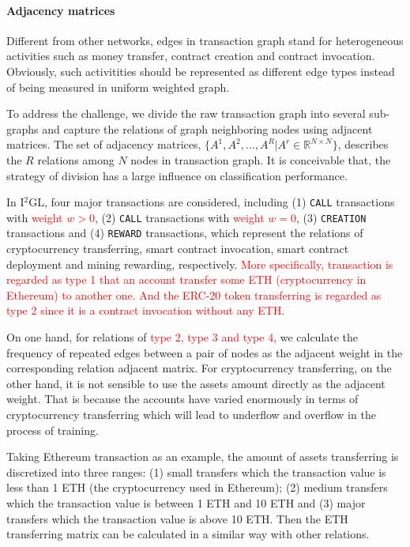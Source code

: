 \paragraph{Adjacency matrices} Different from other networks, edges in transaction graph stand for heterogeneous activities such as money transfer, contract creation and contract invocation. Obviously, such %
activitities should be represented as different edge types instead of being measured in uniform weighted graph.

To address the challenge, we divide the raw transaction graph into several sub-graphs and capture the relations of graph neighboring nodes using adjacent matrices. The set of adjacency matrices, $\{A^1,A^2,\dots,A^R|A^r\in \mathbb{R}^{N \times N}\}$, describes the $R$ relations among $N$ nodes in transaction graph. It is conceivable that, the strategy of division has a large influence on classification performance.

In I$^2$GL, four major transactions are considered, including (1) \texttt{CALL} transactions with \textcolor{red}{weight $w>0$}, (2) \texttt{CALL} transactions with \textcolor{red}{weight $w=0$}, (3) \texttt{CREATION} transactions and (4) \texttt{REWARD} transactions, which represent the relations of cryptocurrency transferring, smart contract invocation, smart contract deployment and mining rewarding, respectively. \textcolor{red}{More specifically, transaction is regarded as type 1 that an account transfer some ETH (cryptocurrency in Ethereum) to another one. And the ERC-20 token transferring is regarded as type 2 since it is a contract invocation without any ETH.}

On one hand, for relations of \textcolor{red}{type 2, type 3 and type 4}, we calculate the frequency of repeated edges between a pair of nodes as the adjacent weight in the corresponding relation adjacent matrix. For cryptocurrency transferring, on the other hand, it is not sensible to use the assets amount directly as the adjacent weight. That is because the accounts have varied enormously in terms of cryptocurrency transferring which will lead to underflow and overflow in the process of training.

 Taking Ethereum transaction as an example, the amount of assets transferring is discretized into three ranges: (1) small transfers which the transaction value is less than 1 ETH (the cryptocurrency used in Ethereum); (2) medium transfers which the transaction value is between 1 ETH and 10 ETH and (3) major transfers which the transaction value is above 10 ETH. Then the ETH transferring matrix can be calculated in a similar way with other relations.

